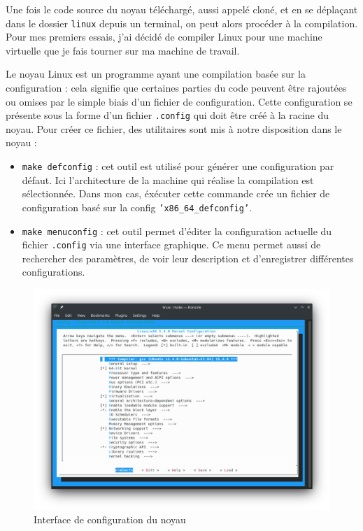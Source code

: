 Une fois le code source du noyau téléchargé, aussi appelé cloné, et en se déplaçant dans le dossier \texttt{linux} depuis un terminal, on peut alors procéder à la compilation. Pour mes premiers essais, j'ai décidé de compiler Linux pour une machine virtuelle que je fais tourner sur ma machine de travail.

Le noyau Linux est un programme ayant une compilation basée sur la configuration : cela signifie que certaines parties du code peuvent être rajoutées ou omises par le simple biais d'un fichier de configuration. Cette configuration se présente sous la forme d'un fichier \texttt{.config} qui doit être créé à la racine du noyau. Pour créer ce fichier, des utilitaires sont mis à notre disposition dans le noyau :
\begin{itemize}
    \item \texttt{make defconfig} : cet outil est utilisé pour générer une configuration par défaut. Ici l'architecture de la machine qui réalise la compilation est sélectionnée. Dans mon cas, éxécuter cette commande crée un fichier de configuration basé sur la config \texttt{'x86\_64\_defconfig'}.
    \item \texttt{make menuconfig} : cet outil permet d'éditer la configuration actuelle du fichier \texttt{.config} via une interface graphique. Ce menu permet aussi de rechercher des paramètres, de voir leur description et d'enregistrer différentes configurations.
\end{itemize}

\begin{figure}[H]
    \centering
    \includegraphics[width=0.65\paperwidth]{Images/make menuconfig.png}
    \caption{Interface de configuration du noyau}
\end{figure}

